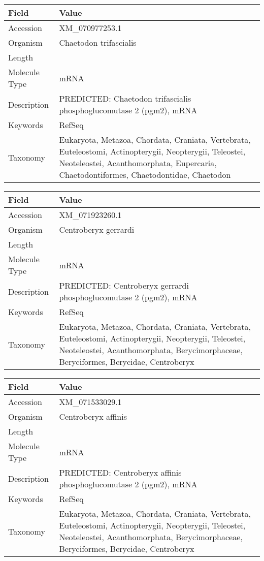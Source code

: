 \documentclass[10pt]{article}
\begin{document}
\vspace{1em}
{\footnotesize
\begin{longtable}{>{\raggedright\arraybackslash}p{4.5cm} >{\raggedright\arraybackslash}p{11.5cm}}
\textbf{Field} & \textbf{Value} \\
\hline
Accession & XM\_070977253.1 \\
Organism & Chaetodon trifascialis \\
Length & 4091 \\
Molecule Type & mRNA \\
Description & PREDICTED: Chaetodon trifascialis phosphoglucomutase 2 (pgm2), mRNA \\
Keywords & RefSeq \\
Taxonomy & Eukaryota, Metazoa, Chordata, Craniata, Vertebrata, Euteleostomi, Actinopterygii, Neopterygii, Teleostei, Neoteleostei, Acanthomorphata, Eupercaria, Chaetodontiformes, Chaetodontidae, Chaetodon \\
\end{longtable}
}

\vspace{1em}
{\footnotesize
\begin{longtable}{>{\raggedright\arraybackslash}p{4.5cm} >{\raggedright\arraybackslash}p{11.5cm}}
\textbf{Field} & \textbf{Value} \\
\hline
Accession & XM\_071923260.1 \\
Organism & Centroberyx gerrardi \\
Length & 3010 \\
Molecule Type & mRNA \\
Description & PREDICTED: Centroberyx gerrardi phosphoglucomutase 2 (pgm2), mRNA \\
Keywords & RefSeq \\
Taxonomy & Eukaryota, Metazoa, Chordata, Craniata, Vertebrata, Euteleostomi, Actinopterygii, Neopterygii, Teleostei, Neoteleostei, Acanthomorphata, Berycimorphaceae, Beryciformes, Berycidae, Centroberyx \\
\end{longtable}
}

\vspace{1em}
{\footnotesize
\begin{longtable}{>{\raggedright\arraybackslash}p{4.5cm} >{\raggedright\arraybackslash}p{11.5cm}}
\textbf{Field} & \textbf{Value} \\
\hline
Accession & XM\_071533029.1 \\
Organism & Centroberyx affinis \\
Length & 3021 \\
Molecule Type & mRNA \\
Description & PREDICTED: Centroberyx affinis phosphoglucomutase 2 (pgm2), mRNA \\
Keywords & RefSeq \\
Taxonomy & Eukaryota, Metazoa, Chordata, Craniata, Vertebrata, Euteleostomi, Actinopterygii, Neopterygii, Teleostei, Neoteleostei, Acanthomorphata, Berycimorphaceae, Beryciformes, Berycidae, Centroberyx \\
\end{longtable}
}
\end{document}
